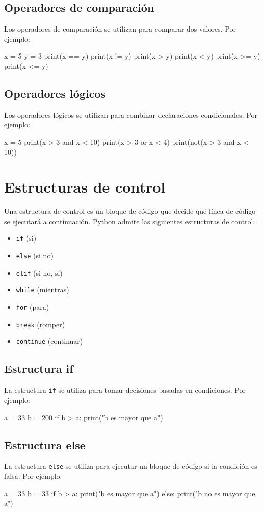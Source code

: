 \documentclass{article}
\begin{document}
\subsection{Operadores de comparación}
Los operadores de comparación se utilizan para comparar dos valores. Por ejemplo:
\begin{python_code}
x = 5
y = 3
print(x == y)
print(x != y)
print(x > y)
print(x < y)
print(x >= y)
print(x <= y)
\end{python_code}

\subsection{Operadores lógicos}
Los operadores lógicos se utilizan para combinar declaraciones condicionales. Por ejemplo:
\begin{python_code}
x = 5
print(x > 3 and x < 10)
print(x > 3 or x < 4)
print(not(x > 3 and x < 10))
\end{python_code}

\section{Estructuras de control}
Una estructura de control es un bloque de código que decide qué línea de código se ejecutará a continuación. Python admite las siguientes estructuras de control:
\begin{itemize}
    \item \texttt{if} (si)
    \item \texttt{else} (si no)
    \item \texttt{elif} (si no, si)
    \item \texttt{while} (mientras)
    \item \texttt{for} (para)
    \item \texttt{break} (romper)
    \item \texttt{continue} (continuar)
\end{itemize}
\subsection{Estructura if}
La estructura \texttt{if} se utiliza para tomar decisiones basadas en condiciones. Por ejemplo:
\begin{python_code}
a = 33
b = 200
if b > a:
  print("b es mayor que a")
\end{python_code}
\subsection{Estructura else}
La estructura \texttt{else} se utiliza para ejecutar un bloque de código si la condición es falsa. Por ejemplo:
\begin{python_code}
a = 33
b = 33
if b > a:
  print("b es mayor que a")
else:
  print("b no es mayor que a")
\end{python_code}
\end{document}
